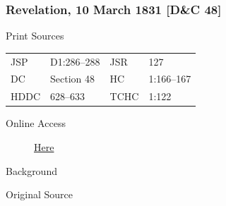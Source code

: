 		\subsubsection{Revelation, 10 March 1831 [D\&C 48]}
			\label{EMS-1831-JS-10-MAR-1831}
		
			\begin{description}
				\item[Print Sources]
			\end{description}

				\begin{tabular}{p{0.5in}p{1in}p{0.5in}p{1in}}
				JSP	 	& D1:286--288	& JSR 		& 127 \\
				DC	 	& Section 48 	& HC 		& 1:166--167 \\
				HDDC 	& 628--633		& TCHC 		& 1:122 \\
				\end{tabular}
			
			\begin{description}
				\item[Online Access] \href{https://www.josephsmithpapers.org/paper-summary/revelation-10-march-1831-dc-48/1}{Here}
			\end{description}
			
			\begin{description}
				\item[Background]
			\end{description}
			
			
			\begin{description}
				\item[Original Source]
			\end{description}
			
			
